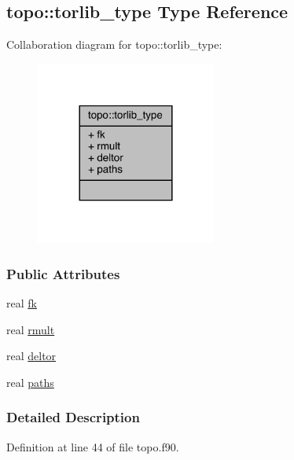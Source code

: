 \hypertarget{structtopo_1_1torlib__type}{\subsection{topo\-:\-:torlib\-\_\-type Type Reference}
\label{structtopo_1_1torlib__type}
}


Collaboration diagram for topo\-:\-:torlib\-\_\-type\-:
\nopagebreak
\begin{figure}[H]
\begin{center}
\leavevmode
\includegraphics[width=168pt]{structtopo_1_1torlib__type__coll__graph}
\end{center}
\end{figure}
\subsubsection*{Public Attributes}
\begin{DoxyCompactItemize}
\item 
real \hyperlink{structtopo_1_1torlib__type_a39792c4241ecf5083ebab9c42b77300a}{fk}
\item 
real \hyperlink{structtopo_1_1torlib__type_a9d32d992b83508a26d9e73619461fbf4}{rmult}
\item 
real \hyperlink{structtopo_1_1torlib__type_ade9d0d27a7729316f39afadabd33a209}{deltor}
\item 
real \hyperlink{structtopo_1_1torlib__type_a9cf20e6f9aed101cf320621449383017}{paths}
\end{DoxyCompactItemize}


\subsubsection{Detailed Description}


Definition at line 44 of file topo.\-f90.



